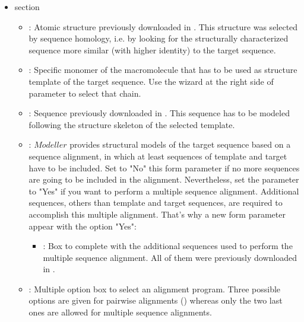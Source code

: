 \begin{itemize}
  \begin{itemize}
   \item {} section\\
  

  \begin{itemize}
   \item {}: Atomic structure previously downloaded in \scipion. This structure was selected by sequence homology, i.e. by looking for the structurally characterized sequence more similar (with higher identity) to the target sequence.\\
   \item {}: Specific monomer of the macromolecule that has to be used as structure template of the target sequence. Use the wizard at the right side of  parameter to select that chain.\\
   \item {}: Sequence previously downloaded in \scipion. This sequence has to be modeled following the structure skeleton of the selected template.\\
   \item {}: $Modeller$ provides structural models of the target sequence based on a sequence alignment, in which at least sequences of template and target have to be included. Set to "No" this form parameter if no more sequences are going to be included in the alignment. Nevertheless, set the parameter to "Yes" if you want to perform a multiple sequence alignment. Additional sequences, others than template and target sequences, are required to accomplish this multiple alignment. That's why a new form parameter appear with the option "Yes":\\
    \begin{itemize}
	 \item {}: Box to complete with the additional sequences used to perform the multiple sequence alignment. All of them were previously downloaded in \scipion.\\
	\end{itemize}
   \item {}: Multiple option box to select an alignment program. Three possible options are given for pairwise alignments () whereas only the two last ones are allowed for multiple sequence alignments.\\
   \end{itemize}
   

\end{itemize}
\end{itemize}
